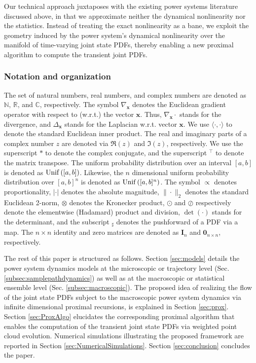 \documentclass[10pt,twocolumn]{IEEEtran}
\begin{document}
Our technical approach juxtaposes with the existing power systems literature discussed above, in that we approximate neither the dynamical nonlinearity nor the statistics. Instead of treating the exact nonlinearity as a bane, we exploit the geometry induced by the power system's dynamical nonlinearity over the manifold of time-varying joint state PDFs, thereby enabling a new proximal algorithm to compute the transient joint PDFs.

\subsubsection{Notation and organization}
The set of natural numbers, real numbers, and complex numbers are denoted as $\mathbb{N}$, $\mathbb{R}$, and $\mathbb{C}$, respectively. The symbol $\nabla_{\bm{x}}$ denotes the Euclidean gradient operator with respect to (w.r.t.) the vector $\bm{x}$. Thus, $\nabla_{\bm{x}}\cdot$ stands for the divergence, and $\Delta_{\bm{x}}$ stands for the Laplacian w.r.t. vector $\bm{x}$. We use $\langle\cdot,\cdot\rangle$ to denote the standard Euclidean inner product. The real and imaginary parts of a complex number $z$ are denoted via $\Re(z)$ and $\Im(z)$, respectively. We use the superscript $*$ to denote the complex conjugate, and the superscript $^{\top}$ to denote the matrix transpose. The uniform probability distribution over an interval $[a,b]$ is denoted as ${\rm{Unif}}\left([a,b]\right)$. Likewise, the $n$ dimensional uniform probability distribution over $[a,b]^{n}$ is denoted as ${\rm{Unif}}\left([a,b]^{n}\right)$. The symbol $\propto$ denotes proportionality, $|\cdot|$ denotes the absolute magnitude, $\|\cdot\|_{2}$ denotes the standard Euclidean 2-norm, $\otimes$ denotes the Kronecker product, $\odot$ and $\oslash$ respectively denote the elementwise (Hadamard) product and division, $\det(\cdot)$ stands for the determinant, and the subscript $_{\sharp}$ denotes the pushforward of a PDF via a map. The $n\times n$ identity and zero matrices are denoted as $\bm{I}_{n}$ and $\bm{0}_{n\times n}$, respectively.

The rest of this paper is structured as follows. Section \ref{sec:models} details the power system dynamics models at the microscopic or trajectory level (Sec. \ref{subsec:samplepathdynamics}) as well as at the macroscopic or statistical ensemble level (Sec. \ref{subsec:macroscopic}). The proposed idea of realizing the flow of the joint state PDFs subject to the macroscopic power system dynamics via infinite dimensional proximal recursions, is explained in Section \ref{sec:prox}. Section \ref{sec:ProxAlgo} elucidates the corresponding proximal algorithm that enables the computation of the transient joint state PDFs via weighted point cloud evolution. Numerical simulations illustrating the proposed framework are reported in Section \ref{sec:NumericalSimulations}. Section \ref{sec:conclusion} concludes the paper.
\end{document}
